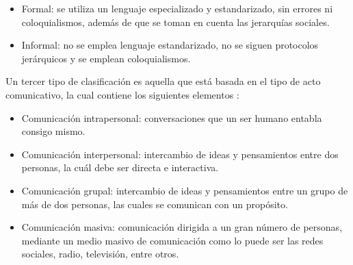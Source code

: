 \begin{itemize}

\item Formal: se utiliza un lenguaje especializado y estandarizado, sin errores ni coloquialismos, además de que se toman en cuenta las jerarquías sociales.
\item Informal: no se emplea lenguaje estandarizado, no se siguen protocolos jerárquicos y se emplean coloquialismos.
\end{itemize}
Un tercer tipo de clasificación es aquella que está basada en el tipo de acto comunicativo, la cual contiene los siguientes elementos \cite{ref23}:
\begin{itemize}
\item Comunicación intrapersonal: conversaciones que un ser humano entabla consigo mismo.
\item Comunicación interpersonal: intercambio de ideas y pensamientos entre dos personas, la cuál debe ser directa e interactiva.
\item Comunicación grupal: intercambio de ideas y pensamientos entre un grupo de más de dos personas, las cuales se comunican con un propósito.
\item Comunicación masiva: comunicación dirigida a un gran número de personas, mediante un medio masivo de comunicación como lo puede ser las redes sociales, radio, televisión, entre otros.
\end{itemize}

